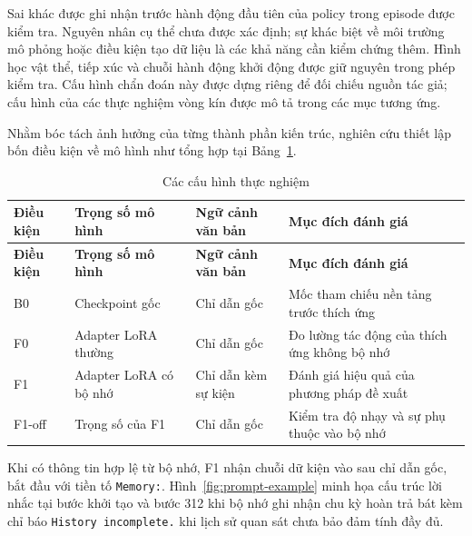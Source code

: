 Sai khác được ghi nhận trước hành động đầu tiên của policy trong episode được kiểm tra. Nguyên nhân cụ thể chưa được xác định; sự khác biệt về môi trường mô phỏng hoặc điều kiện tạo dữ liệu là các khả năng cần kiểm chứng thêm. Hình học vật thể, tiếp xúc và chuỗi hành động khởi động được giữ nguyên trong phép kiểm tra. Cấu hình chẩn đoán này được dựng riêng để đối chiếu nguồn tác giả; cấu hình của các thực nghiệm vòng kín được mô tả trong các mục tương ứng.

Nhằm bóc tách ảnh hưởng của từng thành phần kiến trúc, nghiên cứu thiết lập bốn điều kiện về mô hình như tổng hợp tại Bảng~\ref{tab:experimental-conditions}.

\begingroup\small\setlength{\tabcolsep}{4pt}\renewcommand{\arraystretch}{1.15}
\begin{longtable}{>{\raggedright\arraybackslash}p{}|>{\raggedright\arraybackslash}p{}|>{\raggedright\arraybackslash}p{}|>{\raggedright\arraybackslash}p{}}
\caption{Các cấu hình thực nghiệm}\label{tab:experimental-conditions}\\
\toprule
\textbf{Điều kiện} & \textbf{Trọng số mô hình} & \textbf{Ngữ cảnh văn bản} & \textbf{Mục đích đánh giá} \\
\midrule\endfirsthead
\toprule
\textbf{Điều kiện} & \textbf{Trọng số mô hình} & \textbf{Ngữ cảnh văn bản} & \textbf{Mục đích đánh giá} \\
\midrule\endhead
\bottomrule\endfoot
B0 & Checkpoint gốc & Chỉ dẫn gốc & Mốc tham chiếu nền tảng trước thích ứng \\
F0 & Adapter LoRA thường & Chỉ dẫn gốc & Đo lường tác động của thích ứng không bộ nhớ \\
F1 & Adapter LoRA có bộ nhớ & Chỉ dẫn kèm sự kiện & Đánh giá hiệu quả của phương pháp đề xuất \\
F1-off & Trọng số của F1 & Chỉ dẫn gốc & Kiểm tra độ nhạy và sự phụ thuộc vào bộ nhớ \\
\end{longtable}
\endgroup

Khi có thông tin hợp lệ từ bộ nhớ, F1 nhận chuỗi dữ kiện vào sau chỉ dẫn gốc, bắt đầu với tiền tố \texttt{Memory:}. Hình~\ref{fig:prompt-example} minh họa cấu trúc lời nhắc tại bước khởi tạo và bước 312 khi bộ nhớ ghi nhận chu kỳ hoàn trả bát kèm chỉ báo \texttt{History incomplete.} khi lịch sử quan sát chưa bảo đảm tính đầy đủ.

